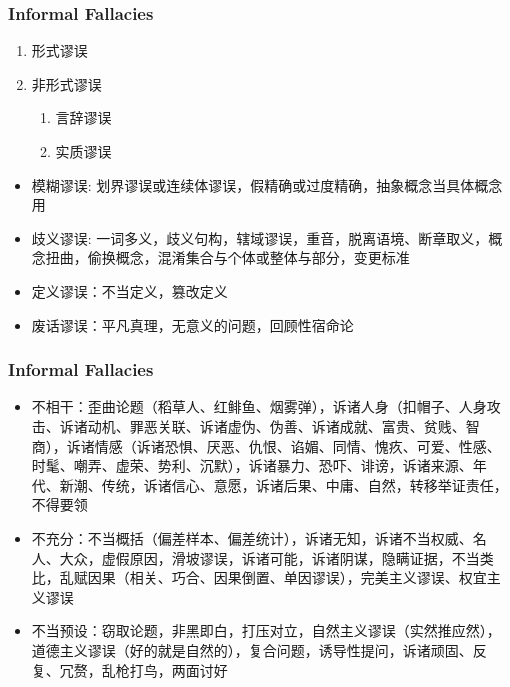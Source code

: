\documentclass[UTF8,11pt,colorlinks,compress,openany]{beamer}%
\begin{document}
\begin{frame}\frametitle{Informal Fallacies}
\begin{enumerate}[i]
	\item 形式谬误
	\item 非形式谬误
		\begin{enumerate}[1.]
			\item 言辞谬误
			\item 实质谬误
		\end{enumerate}
\end{enumerate}
\begin{itemize}
	\item 模糊谬误: 划界谬误或连续体谬误，假精确或过度精确，抽象概念当具体概念用
	\item 歧义谬误: 一词多义，歧义句构，辖域谬误，重音，脱离语境、断章取义，概念扭曲，偷换概念，混淆集合与个体或整体与部分，变更标准
	\item 定义谬误：不当定义，篡改定义
	\item 废话谬误：平凡真理，无意义的问题，回顾性宿命论
\end{itemize}
\end{frame}

\begin{frame}\frametitle{Informal Fallacies}
\begin{itemize}
	\item 不相干：歪曲论题（稻草人、红鲱鱼、烟雾弹），诉诸人身（扣帽子、人身攻击、诉诸动机、罪恶关联、诉诸虚伪、伪善、诉诸成就、富贵、贫贱、智商），诉诸情感（诉诸恐惧、厌恶、仇恨、谄媚、同情、愧疚、可爱、性感、时髦、嘲弄、虚荣、势利、沉默），诉诸暴力、恐吓、诽谤，诉诸来源、年代、新潮、传统，诉诸信心、意愿，诉诸后果、中庸、自然，转移举证责任，不得要领
	\item 不充分：不当概括（偏差样本、偏差统计），诉诸无知，诉诸不当权威、名人、大众，虚假原因，滑坡谬误，诉诸可能，诉诸阴谋，隐瞒证据，不当类比，乱赋因果（相关、巧合、因果倒置、单因谬误），完美主义谬误、权宜主义谬误
	\item 不当预设：窃取论题，非黑即白，打压对立，自然主义谬误（实然推应然），道德主义谬误（好的就是自然的），复合问题，诱导性提问，诉诸顽固、反复、冗赘，乱枪打鸟，两面讨好
\end{itemize}
\end{frame}
\end{document}
